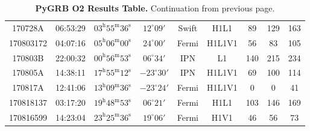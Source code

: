 \documentclass[11pt]{cuthesis}
\begin{document}
\begin{landscape}
\begin{table}
\begin{tabular}{ccccccccc}
170728A   & 06:53:29  & $03^{\mathrm{h}}55^{\mathrm{m}}36^{\mathrm{s}}$ & $12^{\circ}09'$ &  Swift   & H1L1   & 89  & 129 & 163 \\
170803172 & 04:07:16  & $05^{\mathrm{h}}06^{\mathrm{m}}00^{\mathrm{s}}$ & $24^{\circ}00'$ &  Fermi   & H1L1V1 & 56  & 83  & 105 \\
170803B   & 22:00:32  & $00^{\mathrm{h}}56^{\mathrm{m}}53^{\mathrm{s}}$ & $06^{\circ}34'$ &  IPN   & L1       & 140 & 215 & 234 \\
170805A   & 14:38:11  & $17^{\mathrm{h}}55^{\mathrm{m}}12^{\mathrm{s}}$ & $-23^{\circ}30'$ & IPN   & H1L1V1   & 69  & 100 & 114 \\
170817A   & 12:41:06  & $13^{\mathrm{h}}09^{\mathrm{m}}36^{\mathrm{s}}$ & $-23^{\circ}24'$ & Fermi   & H1L1V1 & 0   & 0   & 41 \\
170818137 & 03:17:20  & $19^{\mathrm{h}}48^{\mathrm{m}}53^{\mathrm{s}}$ & $06^{\circ}21'$ &  Fermi   & H1L1   & 103 & 146 & 169 \\
170816599 & 14:23:04  & $23^{\mathrm{h}}25^{\mathrm{m}}36^{\mathrm{s}}$ & $19^{\circ}06'$ &  Fermi   & H1V1   & 46  & 56  & 73 \\ 
\end{tabular}
\caption{\textbf{PyGRB O2 Results Table.} Continuation from previous page.}
 \label{tab:grbs2}
\end{table}
\end{landscape}
\end{document}
